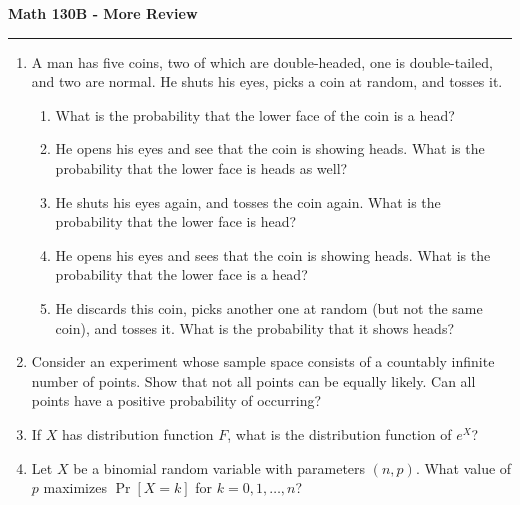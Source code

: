 \documentclass[11pt,letterpaper]{report}
\begin{document}
\begin{center}
{\bf \Large Math 130B - More Review}
\vspace{0.2cm}
\hrule
\end{center}


\begin{enumerate}
	\item  A man has five coins, two of which are double-headed, one is double-tailed, and two are normal. He shuts his eyes, picks a coin at random, and tosses it. 
	\begin{enumerate}
    	\item What is the probability that the lower face of the coin is a head?

    	\vfill

    	\item He opens his eyes and see that the coin is showing heads. What is the probability that the lower face is heads as well? 

    	\vfill

    	\item He shuts his eyes again, and tosses the coin again. What is the probability that the lower face is head?

    	\vfill

    	\item He opens his eyes and sees that the coin is showing heads. What is the probability that the lower face is a head? 

    	\vfill

    	\item He discards this coin, picks another one at random (but not the same coin), and tosses it. What is the probability that it shows heads?
	\end{enumerate}

	\vfill

	\item Consider an experiment whose sample space consists of a countably infinite number of points. Show that not all points can be equally likely. Can all points have a positive probability of occurring?

	\vfill

	\item If $X$ has distribution function $F$, what is the distribution function of $e^X$?

	\vfill

	\item Let $X$ be a binomial random variable with parameters $(n, p)$. What value of $p$ maximizes $\Pr[X =k]$ for $k = 0, 1, \ldots, n$?

	\vfill
\end{enumerate}
\end{document}
